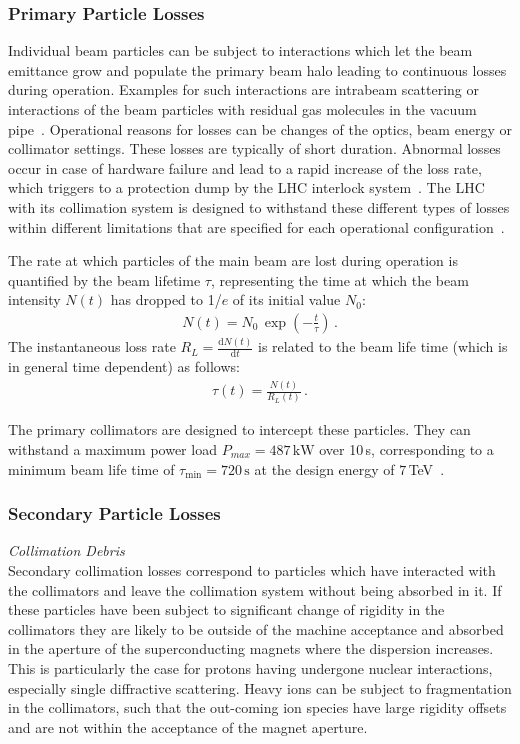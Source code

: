 \subsubsection{Primary Particle Losses}
%
Individual beam particles can be subject to interactions which let the beam emittance grow and populate the primary beam halo leading to continuous losses during operation. Examples for such interactions are intrabeam scattering or interactions of the beam particles with residual gas molecules in the vacuum pipe~\cite{}. Operational reasons for losses can be changes of the optics, beam energy or collimator settings. These losses are typically of short duration. Abnormal losses occur in case of hardware failure and lead to a rapid increase of the loss rate, which triggers to a protection dump by the LHC interlock system~\citedr. The LHC with its collimation system is designed to withstand these different types of losses within different limitations that are specified for each operational configuration~\citedr.

The rate at which particles of the main beam are lost during operation is quantified by the beam lifetime $\tau$, representing the time at which the beam intensity $N(t)$ has dropped to 1/$e$ of its initial value $N_0$:
%
\begin{align}
   N(t) = N_0 \, \exp \left( - \frac{t}{\tau} \right) \, .
\end{align}
%
The instantaneous loss rate $R_L = \frac{\mathrm{d} N(t)}{\mathrm{d}t}$ is related to the beam life time (which is in general time dependent) as follows:
%
\begin{align}
  \tau(t) = \frac{N(t)}{R_L(t)} \, . \label{eq:taudef}
\end{align}
%


The primary collimators are designed to intercept these particles. They can withstand a maximum power load $P_{max}= 487\,\text{kW}$ over 10$\,$s, corresponding to a minimum beam life time of $\tau_\text{min}=720\,\text{s}$ at the design energy of $7\,$TeV~\cite{EPAC02:TUAGB01}. 

\subsubsection{Secondary Particle Losses}

%
\textit{Collimation Debris} 
\\
Secondary collimation losses correspond to particles which have interacted with the collimators and  leave the collimation system without being absorbed in it. If these particles have been subject to significant change of rigidity in the collimators they are likely to be outside of the machine acceptance and absorbed in the aperture of the superconducting magnets where the dispersion increases. This is particularly the case for protons having undergone nuclear interactions, especially single diffractive scattering. Heavy ions can be subject to fragmentation in the collimators, such that the out-coming ion species have large rigidity offsets and are not within the acceptance of the magnet aperture.


